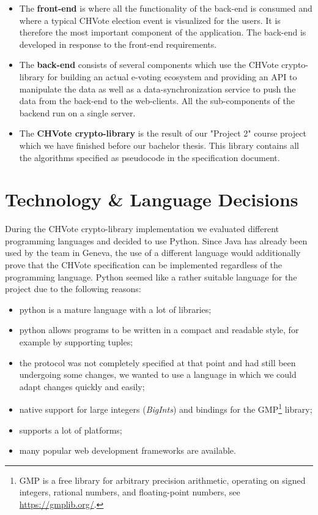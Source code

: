 \begin{itemize}
	\item The \textbf{front-end} is where all the functionality of the back-end is consumed and where a typical CHVote election event is visualized for the users. It is therefore the most important component of the application. The back-end is developed in response to the front-end requirements.
	\item The \textbf{back-end} consists of several components which use the CHVote crypto-library for building an actual e-voting ecosystem and providing an API to manipulate the data as well as a data-synchronization service to push the data from the back-end to the web-clients. All the sub-components of the backend run on a single server.
	\item The \textbf{CHVote crypto-library} is the result of our "{}Project 2"{} course project which we have finished before our bachelor thesis. This library contains all the algorithms specified as pseudocode in the specification document.
\end{itemize}

\section{Technology \& Language Decisions}
During the CHVote crypto-library implementation we evaluated different programming languages and decided to use Python. Since Java has already been used by the team in Geneva, the use of a different language would additionally prove that the CHVote specification can be implemented regardless of the programming language. Python seemed like a rather suitable language for the project due to the following reasons:
\begin{itemize}
	\item python is a mature language with a lot of libraries;
	\item python allows programs to be written in a compact and readable style, for example by supporting tuples;
	\item the protocol was not completely specified at that point and had still been undergoing some changes, we wanted to use a language in which we could adapt changes quickly and easily;
	\item native support for large integers (\textit{BigInts}) and bindings for the GMP\footnote{GMP is a free library for arbitrary precision arithmetic, operating on signed integers, rational numbers, and floating-point numbers, see \url{https://gmplib.org/}.} library;
	\item supports a lot of platforms;
	\item many popular web development frameworks are available.
\end{itemize}

